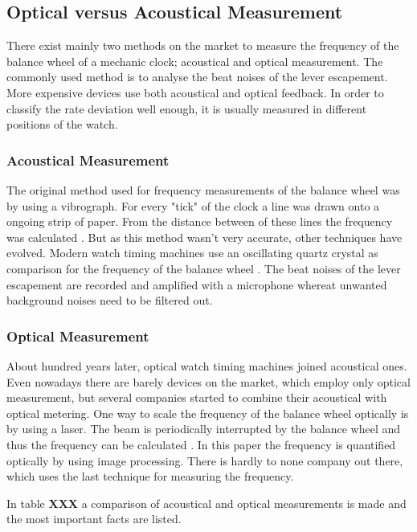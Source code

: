 \documentclass[12pt, a4paper]{report}
\begin{document}
     \subsection{Optical versus Acoustical Measurement}
    There exist mainly two methods on the market to measure the frequency of the balance wheel of a mechanic clock; acoustical and optical measurement. The commonly used method is to analyse the beat noises of the lever escapement. More expensive devices use both acoustical and optical feedback. In order to classify the rate deviation well enough, it is usually measured in different positions of the watch.
    
    \subsubsection{Acoustical Measurement}
    The original method used for frequency measurements of the balance wheel was by using a vibrograph. For every "tick" of the clock a line was drawn onto a ongoing strip of paper. From the distance between of these lines the frequency was calculated \cite{Zeitwaage}. But as this method wasn't very accurate, other techniques have evolved.  
    Modern watch timing machines use an oscillating quartz crystal as comparison for the frequency of the balance wheel \cite{Zeitwaage}. The beat noises of the lever escapement are recorded and amplified with a microphone whereat unwanted background noises need to be filtered out. 
    
    \subsubsection{Optical Measurement}
    About hundred years later, optical watch timing machines joined acoustical ones. Even nowadays there are barely devices on the market, which employ only optical measurement, but several companies started to combine their acoustical with optical metering. One way to scale the frequency of the balance wheel optically is by using a laser. The beam is periodically interrupted by the balance wheel and thus the frequency can be calculated \cite{Lombardi2011}. In this paper the frequency is quantified optically by using image processing. There is hardly to none company out there, which uses the last technique for measuring the frequency.
    
    In table \textbf{XXX} a comparison of acoustical and optical measurements is made and the most important facts are listed.
    
\end{document}
